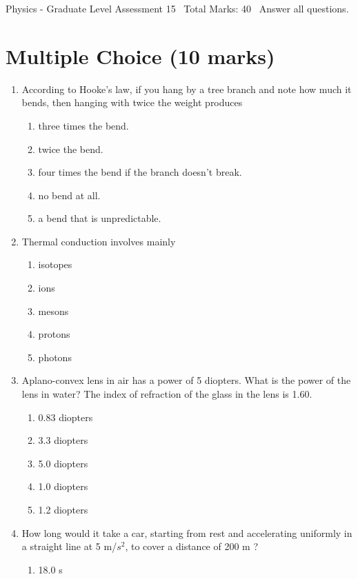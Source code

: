 \documentclass[12pt]{article}
\begin{document}
\begin{center}
Physics - Graduate Level Assessment 15 \
Total Marks: 40 \
Answer all questions.
\end{center}

\section*{Multiple Choice (10 marks)}
\begin{enumerate}[label=\arabic*.]
\item According to Hooke's law, if you hang by a tree branch and note how much it bends, then hanging with twice the weight produces
\begin{enumerate}[label=(\alph*)]
    \item three times the bend.
    \item twice the bend.
    \item four times the bend if the branch doesn't break.
    \item no bend at all.
    \item a bend that is unpredictable.
\end{enumerate}
\item Thermal conduction involves mainly
\begin{enumerate}[label=(\alph*)]
    \item isotopes
    \item ions
    \item mesons
    \item protons
    \item photons
\end{enumerate}
\item Aplano-convex lens in air has a power of 5 diopters. What is the power of the lens in water? The index of refraction of the glass in the lens is 1.60.
\begin{enumerate}[label=(\alph*)]
    \item 0.83 diopters
    \item 3.3 diopters
    \item 5.0 diopters
    \item 1.0 diopters
    \item 1.2 diopters
\end{enumerate}
\item How long would it take a car, starting from rest and accelerating uniformly in a straight line at 5 m/$s^2$, to cover a distance of 200 m ?
\begin{enumerate}[label=(\alph*)]
    \item 18.0 s

\end{enumerate}
\end{enumerate}
\end{document}

